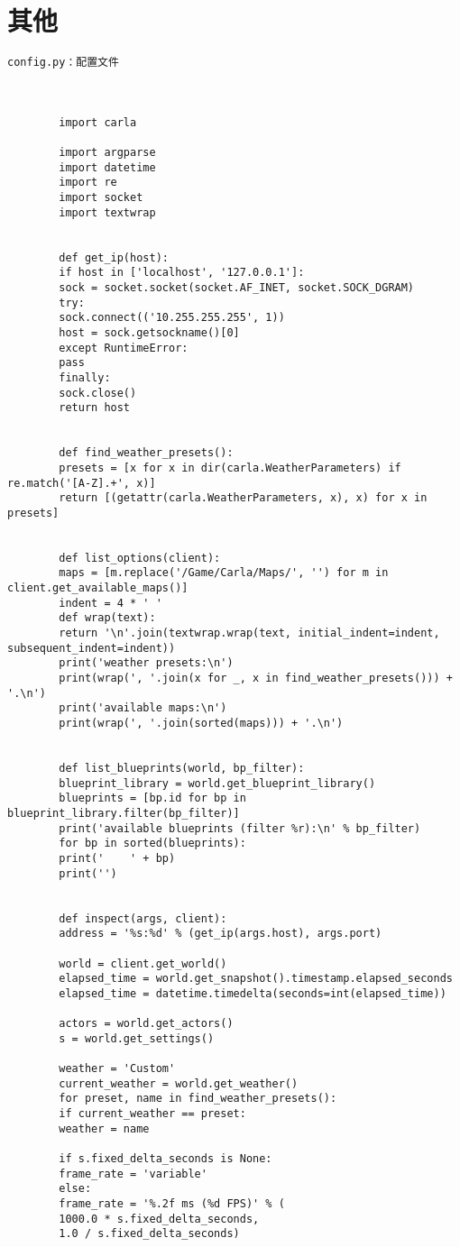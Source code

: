 \section{其他}
\begin{lstlisting}
config.py：配置文件



		import carla
		
		import argparse
		import datetime
		import re
		import socket
		import textwrap
		
		
		def get_ip(host):
		if host in ['localhost', '127.0.0.1']:
		sock = socket.socket(socket.AF_INET, socket.SOCK_DGRAM)
		try:
		sock.connect(('10.255.255.255', 1))
		host = sock.getsockname()[0]
		except RuntimeError:
		pass
		finally:
		sock.close()
		return host
		
		
		def find_weather_presets():
		presets = [x for x in dir(carla.WeatherParameters) if re.match('[A-Z].+', x)]
		return [(getattr(carla.WeatherParameters, x), x) for x in presets]
		
		
		def list_options(client):
		maps = [m.replace('/Game/Carla/Maps/', '') for m in client.get_available_maps()]
		indent = 4 * ' '
		def wrap(text):
		return '\n'.join(textwrap.wrap(text, initial_indent=indent, subsequent_indent=indent))
		print('weather presets:\n')
		print(wrap(', '.join(x for _, x in find_weather_presets())) + '.\n')
		print('available maps:\n')
		print(wrap(', '.join(sorted(maps))) + '.\n')
		
		
		def list_blueprints(world, bp_filter):
		blueprint_library = world.get_blueprint_library()
		blueprints = [bp.id for bp in blueprint_library.filter(bp_filter)]
		print('available blueprints (filter %r):\n' % bp_filter)
		for bp in sorted(blueprints):
		print('    ' + bp)
		print('')
		
		
		def inspect(args, client):
		address = '%s:%d' % (get_ip(args.host), args.port)
		
		world = client.get_world()
		elapsed_time = world.get_snapshot().timestamp.elapsed_seconds
		elapsed_time = datetime.timedelta(seconds=int(elapsed_time))
		
		actors = world.get_actors()
		s = world.get_settings()
		
		weather = 'Custom'
		current_weather = world.get_weather()
		for preset, name in find_weather_presets():
		if current_weather == preset:
		weather = name
		
		if s.fixed_delta_seconds is None:
		frame_rate = 'variable'
		else:
		frame_rate = '%.2f ms (%d FPS)' % (
		1000.0 * s.fixed_delta_seconds,
		1.0 / s.fixed_delta_seconds)
		

\end{lstlisting}
